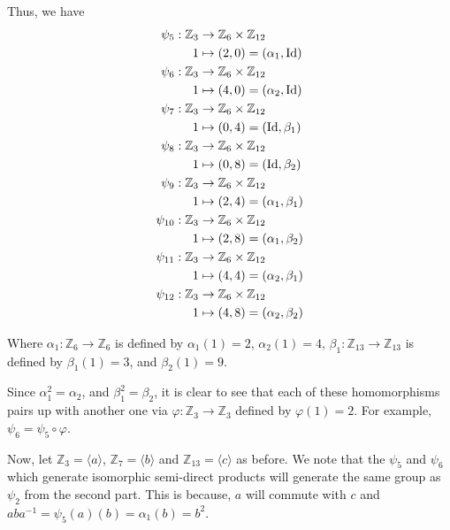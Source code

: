 \documentclass[12pt]{Qual}
\begin{document}
\begin{solution}
\begin{enumerate}[label=(\alph*)]
    Thus, we have \begin{align*}
        \psi_5:\mathbb{Z}_3&\to\mathbb{Z}_6\times\mathbb{Z}_{12}\\
        1&\mapsto (2,0)=(\alpha_1,\text{Id})\\
        \psi_6:\mathbb{Z}_3&\to\mathbb{Z}_6\times\mathbb{Z}_{12}\\
        1&\mapsto (4,0)=(\alpha_2,\text{Id})\\
        \psi_7:\mathbb{Z}_3&\to\mathbb{Z}_6\times\mathbb{Z}_{12}\\
        1&\mapsto (0,4)=(\text{Id},\beta_1)\\
        \psi_8:\mathbb{Z}_3&\to\mathbb{Z}_6\times\mathbb{Z}_{12}\\
        1&\mapsto (0,8)=(\text{Id},\beta_2)\\
        \psi_9:\mathbb{Z}_3&\to\mathbb{Z}_6\times\mathbb{Z}_{12}\\
        1&\mapsto (2,4)=(\alpha_1,\beta_1)\\
        \psi_{10}:\mathbb{Z}_3&\to\mathbb{Z}_6\times\mathbb{Z}_{12}\\
        1&\mapsto (2,8)=(\alpha_1,\beta_2)\\
        \psi_{11}:\mathbb{Z}_3&\to\mathbb{Z}_6\times\mathbb{Z}_{12}\\
        1&\mapsto (4,4)=(\alpha_2,\beta_1)\\
        \psi_{12}:\mathbb{Z}_3&\to\mathbb{Z}_6\times\mathbb{Z}_{12}\\
        1&\mapsto (4,8)=(\alpha_2,\beta_2)\\
    \end{align*}

    Where $\alpha_1:\mathbb{Z}_6\to\mathbb{Z}_6$ is defined by $\alpha_1(1)=2$, $\alpha_2(1)=4$, $\beta_1:\mathbb{Z}_{13}\to\mathbb{Z}_{13}$ is defined by $\beta_1(1)=3$, and $\beta_2(1)=9$.

    Since $\alpha_1^2=\alpha_2$, and $\beta_1^2=\beta_2$, it is clear to see that each of these homomorphisms pairs up with another one via $\varphi:\mathbb{Z}_3\to\mathbb{Z}_3$ defined by $\varphi(1)=2$. For example, $\psi_6=\psi_5\circ\varphi$.

    Now, let $\mathbb{Z}_3=\langle a\rangle$, $\mathbb{Z}_7=\langle b\rangle$ and $\mathbb{Z}_{13}=\langle c\rangle$ as before. We note that the $\psi_5$ and $\psi_6$ which generate isomorphic semi-direct products will generate the same group as $\psi_2$ from the second part. This is because, $a$ will commute with $c$ and $aba^{-1}=\psi_5(a)(b)=\alpha_1(b)=b^2$.


\end{enumerate}
\end{solution}
\end{document}
